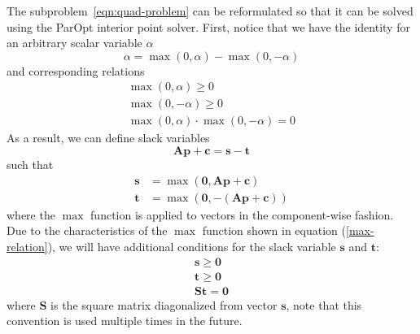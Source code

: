 \documentclass[12pt]{article}
\newcommand{\mb}{\mathbf}
\begin{document}
The subproblem~\eqref{eqn:quad-problem} can be reformulated so that it can be solved using the ParOpt interior point solver.
First, notice that we have the identity for an arbitrary scalar variable $\alpha$
%
\begin{equation*}
    \alpha = \max(0, \alpha) - \max(0, -\alpha)
\end{equation*}
%
and corresponding relations
%
\begin{equation}
\label{max-relation}
\begin{gathered}
    \max(0, \alpha) \ge 0 \\
    \max(0, -\alpha) \ge 0 \\
    \max(0, \alpha)\cdot \max(0, -\alpha) = 0
\end{gathered}
\end{equation}
%
As a result, we can define slack variables
%
\begin{equation*}
    \mb{A}\mb{p} + \mb{c} = \mb{s} - \mb{t}
\end{equation*}
%
such that
%
\begin{equation*}
\begin{aligned}
    \mb{s} & = \max(\mb{0}, \mb{A}\mb{p} + \mb{c}) \\
    \mb{t} & = \max(\mb{0}, -(\mb{A}\mb{p} + \mb{c}))
\end{aligned}
\end{equation*}
%
where the $\max$ function is applied to vectors in the component-wise fashion. Due to the characteristics of the $\max$ function shown in equation (\ref{max-relation}), we will have additional conditions for the slack variable $\mb{s}$ and $\mb{t}$:
%
\begin{equation}
\label{eqn:S}
    \begin{gathered}
    \mb{s} \ge \mb{0} \\
    \mb{t} \ge \mb{0} \\
    \mb{S} \mb{t} = \mb{0}
    \end{gathered}
\end{equation}
%
where $\mb{S}$ is the square matrix diagonalized from vector $\mb{s}$, note that this convention is used multiple times in the future.
\end{document}
